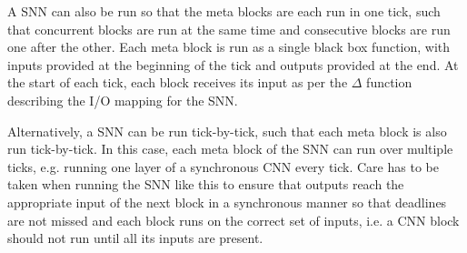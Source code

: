 A \ac{SNN} can also be run so that the meta blocks are each run in one tick, such that concurrent blocks are run at the same time and consecutive blocks are run one after the other.
Each meta block is run as a single black box function, with inputs provided at the beginning of the tick and outputs provided at the end.
At the start of each tick, each block receives its input as per the $\Delta$ function describing the I/O mapping for the \ac{SNN}.

Alternatively, a \ac{SNN} can be run tick-by-tick, such that each meta block is also run tick-by-tick.
In this case, each meta block of the \ac{SNN} can run over multiple ticks, e.g. running one layer of a synchronous \ac{CNN} every tick.
Care has to be taken when running the \ac{SNN} like this to ensure that outputs reach the appropriate input of the next block in a synchronous manner so that deadlines are not missed and each block runs on the correct set of inputs, i.e. a \ac{CNN} block should not run until all its inputs are present.

